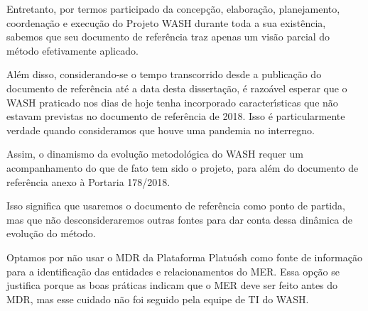 \documentclass[
12pt,		%
openright,	%
twoside,  %
a4paper,			%
chapter=TITLE,		%
english,			%
french,				%
spanish,			%
brazil				%
]{USPSC-classe/USPSC}
\begin{document}
Entretanto, por termos participado da concep\c{c}\~ao, elabora\c{c}\~ao, planejamento, coordena\c{c}\~ao e execu\c{c}\~ao do Projeto WASH durante toda a sua exist\^encia, sabemos que seu documento de refer\^encia traz apenas um vis\~ao parcial do m\'etodo efetivamente aplicado.














Al\'em disso, considerando-se o tempo transcorrido desde a publica\c{c}\~ao do documento de refer\^encia at\'e a data desta disserta\c{c}\~ao, \'e razo\'avel esperar que o WASH praticado nos dias de hoje tenha incorporado caracter\'{\i}sticas que n\~ao estavam previstas no documento de refer\^encia de 2018. Isso \'e particularmente verdade quando consideramos que houve uma pandemia no interregno.














Assim, o dinamismo da evolu\c{c}\~ao metodol\'ogica do WASH requer um acompanhamento do que de fato tem sido o projeto, para al\'em do documento de refer\^encia anexo \`a Portaria 178/2018.














Isso significa que usaremos o documento de refer\^encia como ponto de partida, mas que n\~ao desconsideraremos outras fontes para dar conta dessa din\^amica de evolu\c{c}\~ao do m\'etodo.














Optamos por n\~ao usar o MDR da Plataforma Platu\'osh como fonte de informa\c{c}\~ao para a identifica\c{c}\~ao das entidades e relacionamentos do MER. Essa op\c{c}\~ao se justifica porque as boas pr\'aticas indicam que o MER deve ser feito antes do MDR, mas esse cuidado n\~ao foi seguido pela equipe de TI do WASH.
\end{document}
